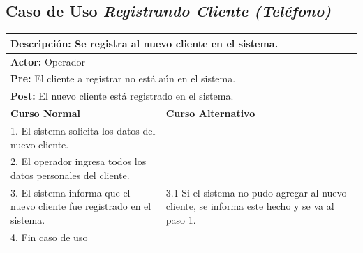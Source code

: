 \documentclass[a4paper]{article}
\begin{document}
\subsection{Caso de Uso \textit{Registrando Cliente (Tel\'efono)}}
\begin{center}
\begin{tabular}{|p{10cm} | p{6cm}|}
\hline
\multicolumn{2}{|p{16cm}|}{\textbf{Descripci\'on:} Se registra al nuevo cliente en el sistema.} \\
\hline
\multicolumn{2}{|l|}{\textbf{Actor:} Operador} \\
\hline
\multicolumn{2}{|l|}{\textbf{Pre:} El cliente a registrar no est\'a a\'un en el sistema.} \\
\hline
\multicolumn{2}{|p{14cm}|}{\textbf{Post:} El nuevo cliente est\'a registrado en el sistema.}\\
\hline
\textbf{Curso Normal}  & \textbf{Curso Alternativo} \\ \hline
1. El sistema solicita los datos del nuevo cliente. & \\ \hline
2. El operador ingresa todos los datos personales del cliente. & \\ \hline
3. El sistema informa que el nuevo cliente fue registrado en el sistema. & 3.1 Si el sistema no pudo agregar al nuevo cliente, se informa este hecho y se va al paso 1. \\ \hline
4. Fin caso de uso & \\ \hline
\end{tabular}
\end{center}
\end{document}
